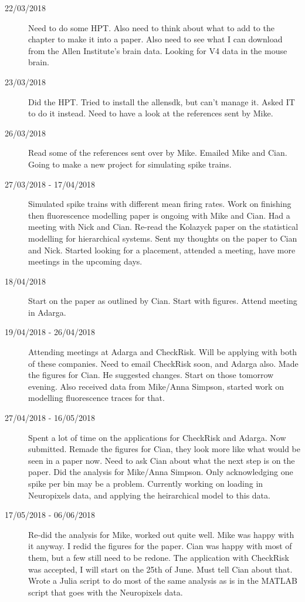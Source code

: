 \documentclass[a4paper,12pt]{article}
\theoremstyle{definition}
\begin{document}
\begin{description}
        \item[22/03/2018] Need to do some HPT. Also need to think about what to add to the chapter to make it into a paper. Also need to see what I can download from the Allen Institute's brain data. Looking for V4 data in the mouse brain.

        \item[23/03/2018] Did the HPT. Tried to install the allensdk, but can't manage it. Asked IT to do it instead. Need to have a look at the references sent by Mike.

        \item[26/03/2018] Read some of the references sent over by Mike. Emailed Mike and Cian. Going to make a new project for simulating spike trains.

        \item[27/03/2018 - 17/04/2018] Simulated spike trains with different mean firing rates. Work on finishing then fluorescence modelling paper is ongoing with Mike and Cian. Had a meeting with Nick and Cian. Re-read the Kolazyck paper on the statistical modelling for hierarchical systems. Sent my thoughts on the paper to Cian and Nick. Started looking for a placement, attended a meeting, have more meetings in the upcoming days.

        \item[18/04/2018] Start on the paper as outlined by Cian. Start with figures. Attend meeting in Adarga.

        \item[19/04/2018 - 26/04/2018] Attending meetings at Adarga and CheckRisk. Will be applying with both of these companies. Need to email CheckRisk soon, and Adarga also. Made the figures for Cian. He suggested changes. Start on those tomorrow evening. Also received data from Mike/Anna Simpson, started work on modelling fluorescence traces for that.

        \item[27/04/2018 - 16/05/2018] Spent a lot of time on the applications for CheckRisk and Adarga. Now submitted. Remade the figures for Cian, they look more like what would be seen in a paper now. Need to ask Cian about what the next step is on the paper. Did the analysis for Mike/Anna Simpson. Only acknowledging one spike per bin may be a problem. Currently working on loading in Neuropixels data, and applying the heirarchical model to this data.

        \item[17/05/2018 - 06/06/2018] Re-did the analysis for Mike, worked out quite well. Mike was happy with it anyway. I redid the figures for the paper. Cian was happy with most of them, but a few still need to be redone. The application with CheckRisk was accepted, I will start on the 25th of June. Must tell Cian about that. Wrote a Julia script to do most of the same analysis as is in the MATLAB script that goes with the Neuropixels data.


\end{description}
\end{document}
